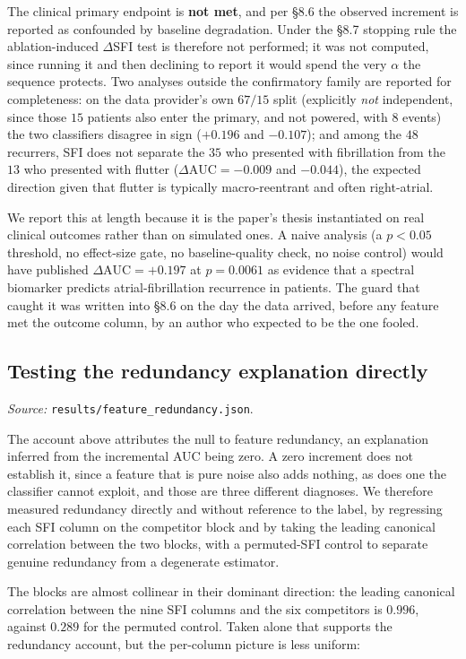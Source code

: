 \documentclass[11pt]{article}
\theoremstyle{definition}
\newcommand{\dAUC}{\Delta\mathrm{AUC}}
\newcommand{\code}[1]{\texttt{#1}}
\begin{document}
The clinical primary endpoint is \textbf{not met}, and per \S8.6 the observed
increment is reported as confounded by baseline degradation. Under the \S8.7
stopping rule the ablation-induced $\Delta$SFI test is therefore not performed; it
was not computed, since running it and then declining to report it would spend the
very $\alpha$ the sequence protects. Two analyses outside the confirmatory family
are reported for completeness: on the data provider's own $67/15$ split
(explicitly \emph{not} independent, since those $15$ patients also enter the
primary, and not powered, with $8$ events) the two classifiers disagree in sign
($+0.196$ and $-0.107$); and among the $48$ recurrers, SFI does not separate the
$35$ who presented with fibrillation from the $13$ who presented with flutter
($\dAUC=-0.009$ and $-0.044$), the expected direction given that flutter is
typically macro-reentrant and often right-atrial.

We report this at length because it is the paper's thesis instantiated on real
clinical outcomes rather than on simulated ones. A naive analysis (a $p<0.05$
threshold, no effect-size gate, no baseline-quality check, no noise control) would
have published $\dAUC=+0.197$ at $p=0.0061$ as evidence that a spectral biomarker
predicts atrial-fibrillation recurrence in patients. The guard that caught it was
written into \S8.6 on the day the data arrived, before any feature met the outcome
column, by an author who expected to be the one fooled.

\subsection{Testing the redundancy explanation directly}
\label{sec:redundancy}
\noindent\emph{Source:}
\code{results/\allowbreak feature\allowbreak\_redundancy.json}.

The account above attributes the null to feature redundancy, an explanation inferred
from the incremental AUC being zero. A zero increment does not establish it, since a
feature that is pure noise also adds nothing, as does one the classifier cannot
exploit, and those are three different diagnoses. We therefore measured redundancy
directly and without reference to the label, by regressing each SFI column on the
competitor block and by taking the leading canonical correlation between the two
blocks, with a permuted-SFI control to separate genuine redundancy from a degenerate
estimator.

The blocks are almost collinear in their dominant direction: the leading canonical
correlation between the nine SFI columns and the six competitors is $0.996$, against
$0.289$ for the permuted control. Taken alone that supports the redundancy account,
but the per-column picture is less uniform:
\end{document}
